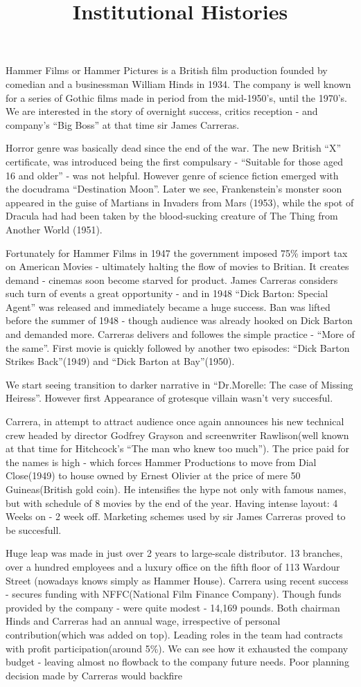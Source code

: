 \documentclass{article}
\title{Institutional Histories}
\begin{document}
\makeheader

Hammer Films or Hammer Pictures is a British film
production founded by comedian and a businessman William
Hinds in 1934. The company is well known for a series of
Gothic films made in period from the mid-1950's, until
the 1970's. We are interested in the story of overnight
success, critics reception - and company's ``Big Boss''
at that time sir James Carreras.  

Horror genre was basically dead since the end of the war.
The new British ``X'' certificate, was introduced being
the first compulsary - ``Suitable for those aged 16 and
older'' - was not helpful. However genre of science
fiction emerged with the docudrama ``Destination Moon''.
Later we see, Frankenstein’s monster soon appeared in the guise of Martians in Invaders
from Mars (1953), while the spot of Dracula had
had been taken by the blood-sucking creature of
The Thing from Another World (1951).  

Fortunately for Hammer Films in 1947 the government
imposed 75\% import tax on American Movies - ultimately
halting the flow of movies to Britian. It creates demand -
cinemas soon become starved for product. James Carreras
considers such turn of events a great opportunity - and
in 1948 ``Dick Barton: Special Agent'' was released and
immediately became a huge success. Ban was lifted before
the summer of 1948 - though audience was already hooked on
Dick Barton and demanded more. Carreras delivers
and followes the simple practice - ``More of the same''.
First movie is quickly followed by another two episodes: 
``Dick Barton Strikes Back''(1949) and ``Dick Barton at
Bay''(1950).  

We start seeing transition to darker narrative in
``Dr.Morelle: The case of Missing Heiress''. However
first Appearance of grotesque villain wasn't very
succesful.  

Carrera, in attempt to attract audience once again
announces his new technical crew headed by director
Godfrey Grayson and screenwriter Rawlison(well known
at that time for Hitchcock's ``The man who knew too
much''). The price paid for the names is high - which
forces Hammer Productions to move from Dial Close(1949)
to house owned by Ernest Olivier at the price of mere
50 Guineas(British gold coin). He intensifies the hype
not only with famous names, but with schedule of 8 movies
by the end of the year. Having intense layout:
4 Weeks on - 2 week off. Marketing schemes used by sir
James Carreras proved to be succesfull.

Huge leap was made in just over 2 years to large-scale
distributor. 13 branches, over a hundred employees and a
luxury office on the fifth floor of 113 Wardour Street
(nowadays knows simply as Hammer House). Carrera using
recent success - secures funding with NFFC(National Film
Finance Company). Though funds provided by the company -
were quite modest - 14,169 pounds. Both chairman Hinds and
Carreras had an annual wage, irrespective of personal
contribution(which was added on top). Leading roles in the
team had contracts with profit participation(around 5\%).
We can see how it exhausted the company budget - leaving
almost no flowback to the company future needs.
Poor planning decision made by Carreras would backfire

\makeworkscited
\end{document}
